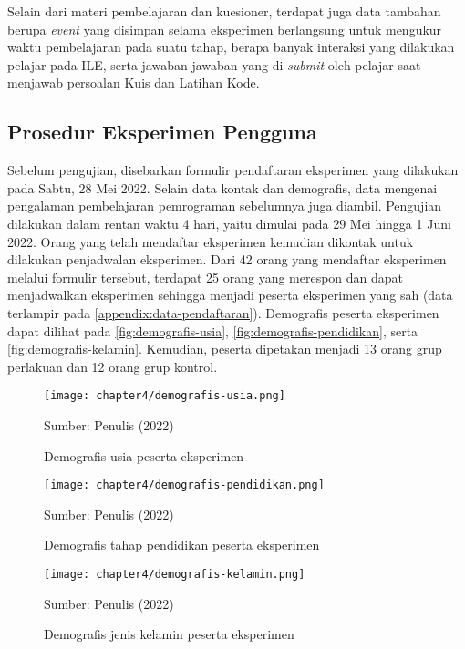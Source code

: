 Selain dari materi pembelajaran dan kuesioner, terdapat juga data tambahan berupa \textit{event} yang disimpan selama eksperimen berlangsung untuk mengukur waktu pembelajaran pada suatu tahap, berapa banyak interaksi yang dilakukan pelajar pada ILE, serta jawaban-jawaban yang di-\textit{submit} oleh pelajar saat menjawab persoalan Kuis dan Latihan Kode.

\subsection{Prosedur Eksperimen Pengguna}
Sebelum pengujian, disebarkan formulir pendaftaran eksperimen yang dilakukan pada Sabtu, 28 Mei 2022. Selain data kontak dan demografis, data mengenai pengalaman pembelajaran pemrograman sebelumnya juga diambil. Pengujian dilakukan dalam rentan waktu 4 hari, yaitu dimulai pada 29 Mei hingga 1 Juni 2022. Orang yang telah mendaftar eksperimen kemudian dikontak untuk dilakukan penjadwalan eksperimen. Dari 42 orang yang mendaftar eksperimen melalui formulir tersebut, terdapat 25 orang yang merespon dan dapat menjadwalkan eksperimen sehingga menjadi peserta eksperimen yang sah (data terlampir pada \autoref{appendix:data-pendaftaran}). Demografis peserta eksperimen dapat dilihat pada \autoref{fig:demografis-usia}, \autoref{fig:demografis-pendidikan}, serta \autoref{fig:demografis-kelamin}. Kemudian, peserta dipetakan menjadi 13 orang grup perlakuan dan 12 orang grup kontrol.

\begin{figure}[!h]
  \centering
  \texttt{[image: chapter4/demografis-usia.png]}
  \caption{Demografis usia peserta eksperimen} \label{fig:demografis-usia}
  Sumber: Penulis (2022)
\end{figure}
\begin{figure}[!h]
  \centering
  \texttt{[image: chapter4/demografis-pendidikan.png]}
  \caption{Demografis tahap pendidikan peserta eksperimen} \label{fig:demografis-pendidikan}
  Sumber: Penulis (2022)
\end{figure}
\begin{figure}[!h]
  \centering
  \texttt{[image: chapter4/demografis-kelamin.png]}
  \caption{Demografis jenis kelamin peserta eksperimen} \label{fig:demografis-kelamin}
  Sumber: Penulis (2022)
\end{figure}

